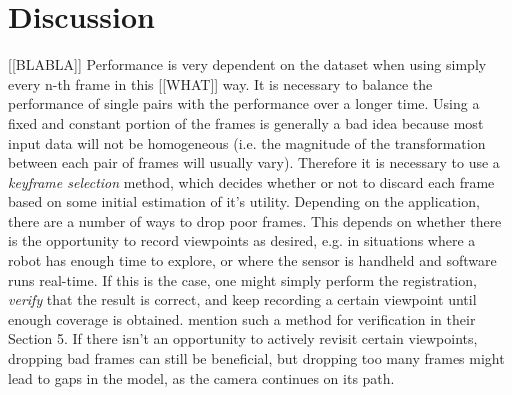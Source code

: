 \documentclass[a4paper]{article}
\begin{document}
\section{Discussion}
[[BLABLA]] Performance is very dependent on the dataset when using simply every n-th frame in this [[WHAT]] way. It is necessary to balance the performance of single pairs with the performance over a longer time. Using a fixed and constant portion of the frames is generally a bad idea because most input data will not be homogeneous (i.e. the magnitude of the transformation between each pair of frames will usually vary). Therefore it is necessary to use a \emph{keyframe selection} method, which decides whether or not to discard each frame based on some initial estimation of it's utility. Depending on the application, there are a number of ways to drop poor frames. This depends on whether there is the opportunity to record viewpoints as desired, e.g. in situations where a robot has enough time to explore, or where the sensor is handheld and software runs real-time. If this is the case, one might simply perform the registration, \emph{verify} that the result is correct, and keep recording a certain viewpoint until enough coverage is obtained. \cite{makadia2006fully} mention such a method for verification in their Section 5. If there isn't an opportunity to actively revisit certain viewpoints, dropping bad frames can still be beneficial, but dropping too many frames might lead to gaps in the model, as the camera continues on its path.


{}

\end{document}
